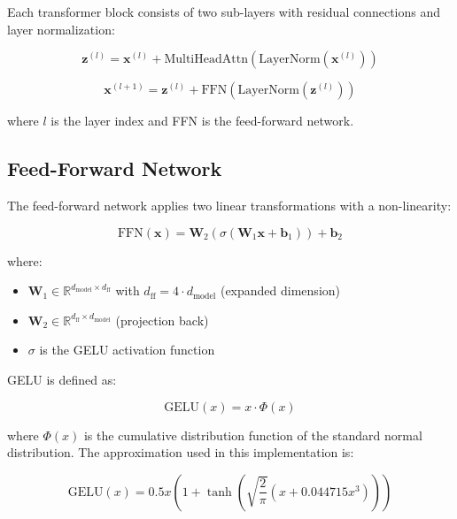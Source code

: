\documentclass[11pt,a4paper]{article}
\begin{document}
Each transformer block consists of two sub-layers with residual connections and layer normalization:

\begin{equation}
\mathbf{z}^{(l)} = \mathbf{x}^{(l)} + \text{MultiHeadAttn}(\text{LayerNorm}(\mathbf{x}^{(l)}))
\end{equation}

\begin{equation}
\mathbf{x}^{(l+1)} = \mathbf{z}^{(l)} + \text{FFN}(\text{LayerNorm}(\mathbf{z}^{(l)}))
\end{equation}

where $l$ is the layer index and FFN is the feed-forward network.

\subsection{Feed-Forward Network}

The feed-forward network applies two linear transformations with a non-linearity:

\begin{equation}
\text{FFN}(\mathbf{x}) = \mathbf{W}_2(\sigma(\mathbf{W}_1\mathbf{x} + \mathbf{b}_1)) + \mathbf{b}_2
\end{equation}

where:
\begin{itemize}
    \item $\mathbf{W}_1 \in \mathbb{R}^{d_{\text{model}} \times d_{\text{ff}}}$ with $d_{\text{ff}} = 4 \cdot d_{\text{model}}$ (expanded dimension)
    \item $\mathbf{W}_2 \in \mathbb{R}^{d_{\text{ff}} \times d_{\text{model}}}$ (projection back)
    \item $\sigma$ is the GELU activation function
\end{itemize}

GELU is defined as:

\begin{equation}
\text{GELU}(x) = x \cdot \Phi(x)
\end{equation}

where $\Phi(x)$ is the cumulative distribution function of the standard normal distribution. The approximation used in this implementation is:

\begin{equation}
\text{GELU}(x) = 0.5x\left(1 + \tanh\left(\sqrt{\frac{2}{\pi}}(x + 0.044715x^3)\right)\right)
\end{equation}
\end{document}
